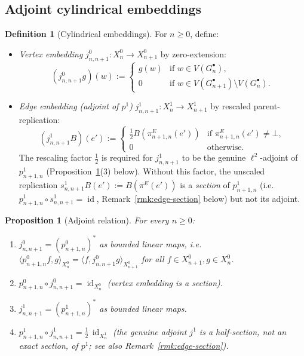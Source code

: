 \documentclass[11pt, a4paper]{amsart}
\newtheorem{proposition}[theorem]{Proposition}
\theoremstyle{definition}
\newtheorem{definition}[theorem]{Definition}
\newcommand{\id}{\operatorname{id}}
\begin{document}
\subsection{Adjoint cylindrical embeddings}

\begin{definition}[Cylindrical embeddings]
\label{def:j}
For $n \geq 0$, define:
\begin{itemize}
\item \emph{Vertex embedding} $j_{n, n+1}^0 \colon X_n^0 \to
  X_{n+1}^0$ by zero-extension:
  \[
    (j_{n, n+1}^0 g)(w) := \begin{cases} g(w) & \text{if } w \in
      V(G_n^\bullet), \\ 0 & \text{if } w \in V(G_{n+1}^\bullet)
      \setminus V(G_n^\bullet). \end{cases}
  \]
\item \emph{Edge embedding (adjoint of $p^1$)}
  $j_{n, n+1}^1 \colon X_n^1 \to X_{n+1}^1$ by rescaled
  parent-replication:
  \[
    (j_{n, n+1}^1 B)(e') := \begin{cases}
      \tfrac{1}{2} B(\pi_{n+1, n}^E(e'))
        & \text{if } \pi_{n+1, n}^E(e') \neq \bot, \\
      0 & \text{otherwise.}
    \end{cases}
  \]
  The rescaling factor $\tfrac{1}{2}$ is required for $j_{n, n+1}^1$
  to be the genuine $\ell^2$-adjoint of $p_{n+1, n}^1$
  (Proposition~\ref{prop:adjoints}(3) below). Without this factor,
  the unscaled replication $s_{n, n+1}^1 B(e') := B(\pi^E(e'))$ is a
  \emph{section} of $p_{n+1, n}^1$ (i.e.\
  $p_{n+1, n}^1 \circ s_{n, n+1}^1 = \id$,
  Remark~\ref{rmk:edge-section} below) but not its adjoint.
\end{itemize}
\end{definition}

\begin{proposition}[Adjoint relation]
\label{prop:adjoints}
For every $n \geq 0$:
\begin{enumerate}
\item $j_{n, n+1}^0 = (p_{n+1, n}^0)^*$ as bounded linear maps,
  i.e.\ $\langle p_{n+1, n}^0 f, g \rangle_{X_n^0} = \langle f,
  j_{n, n+1}^0 g \rangle_{X_{n+1}^0}$ for all $f \in X_{n+1}^0,
  g \in X_n^0$.
\item $p_{n+1, n}^0 \circ j_{n, n+1}^0 = \id_{X_n^0}$ (vertex
  embedding is a section).
\item $j_{n, n+1}^1 = (p_{n+1, n}^1)^*$ as bounded linear maps.
\item $p_{n+1, n}^1 \circ j_{n, n+1}^1 = \tfrac{1}{2}\,\id_{X_n^1}$
  (the genuine adjoint $j^1$ is a half-section, not an exact
  section, of $p^1$; see also
  Remark~\ref{rmk:edge-section}).
\end{enumerate}
\end{proposition}
\end{document}
